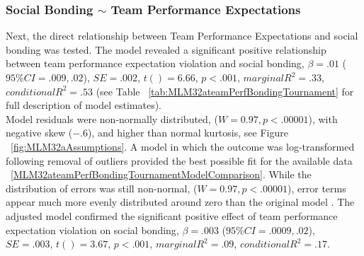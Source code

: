 \documentclass[12pt]{report}
\begin{document}
{\subsubsection{Social Bonding $\sim$ Team Performance Expectations}
Next, the direct relationship between Team Performance Expectations and social bonding was tested.  The model revealed a significant positive relationship between team performance expectation violation and social bonding, $\beta = .01$ ($95\% CI =  .009, .02$), $SE = .002$, $t() = 6.66$, $p < .001$, $marginal R^2 = .33$, $conditional R^2 = .53$ (see Table ~\ref{tab:MLM32ateamPerfBondingTournament} for full description of model estimates).  \\

Model residuals were non-normally distributed, ($W = 0.97, p < .00001$), with negative skew ($-.6$), and higher than normal kurtosis, see Figure ~\ref{fig:MLM32aAssumptions}.  A model in which the outcome was log-transformed following removal of outliers provided the best possible fit for the available data ~\ref{MLM32ateamPerfBondingTournamentModelComparison}. While the distribution of errors was still non-normal, ($W = 0.97, p < .00001$),  error terms appear much more evenly distributed around zero than the original model . The adjusted model confirmed the significant positive effect of team performance expectation violation on social bonding,  $\beta = .003$ ($95\% CI =  .0009, .02$), $SE = .003$, $t() = 3.67$, $p < .001$, $marginal R^2 = .09$, $conditional R^2 = .17$.






}
\end{document}

